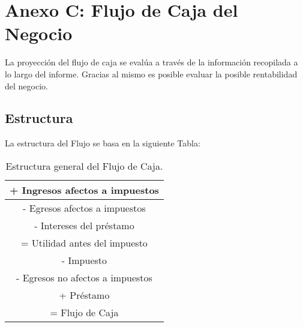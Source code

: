  \section{Anexo C: Flujo de Caja del Negocio}
La proyección del flujo de caja se evalúa a través de la información recopilada a lo largo del informe. Gracias al mismo es posible evaluar la posible rentabilidad del negocio.

\subsection{Estructura}
La estructura del Flujo se basa en la siguiente Tabla:

\begin{table}[H]
  \centering
    \begin{tabular}{|c|}
    \hline
    \textcolor[rgb]{ 0,  .69,  .314}{+ Ingresos afectos a impuestos} \bigstrut\\
    \hline
    \textcolor[rgb]{ 1,  0,  0}{- Egresos afectos a impuestos} \bigstrut\\
    \hline
    \textcolor[rgb]{ 1,  0,  0}{- Intereses del préstamo} \bigstrut\\
    \hline
    \textcolor[rgb]{ 0,  .439,  .753}{= Utilidad antes del impuesto} \bigstrut\\
    \hline
    \textcolor[rgb]{ 1,  0,  0}{- Impuesto} \bigstrut\\
    \hline
    \textcolor[rgb]{ 1,  0,  0}{- Egresos no afectos a impuestos} \bigstrut\\
    \hline
    \textcolor[rgb]{ 0,  .69,  .314}{+ Préstamo} \bigstrut\\
    \hline
    \textcolor[rgb]{ 0,  .439,  .753}{= Flujo de Caja} \bigstrut\\
    \hline
    \end{tabular}%
      \caption{Estructura general del Flujo de Caja.}
  \label{tab:estructura}%
\end{table}%


